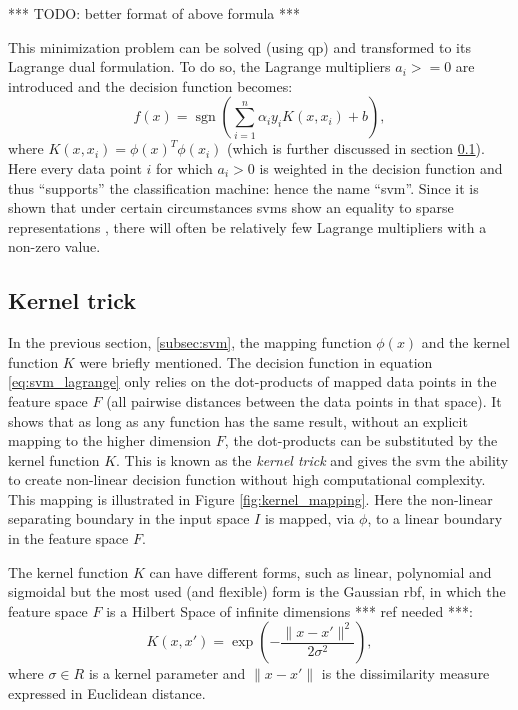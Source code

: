 *** TODO: better format of above formula ***

This minimization problem can be solved (using \gls{qp}) and transformed to its Lagrange dual formulation.
To do so, the Lagrange multipliers $a_i >= 0$ are introduced and the decision function becomes:
\begin{equation}\label{eq:svm_lagrange}
  f(x) = \operatorname{sgn}( \sum_{i=1}^n \alpha_i y_i K(x, x_i) + b),
\end{equation}
where $K(x, x_i) = \phi(x)^T\phi(x_i)$ (which is further discussed in section \ref{subsec:kernel_trick}).
Here every data point $i$ for which $a_i > 0$ is weighted in the decision function and thus ``supports'' the classification machine: hence the name ``\acrlong{svm}''.
Since it is shown that under certain circumstances \gls{svm}s show an equality to sparse representations \cite{girosi1998equivalence}, there will often be relatively few Lagrange multipliers with a non-zero value.



\subsection{Kernel trick}\label{subsec:kernel_trick}
In the previous section, \ref{subsec:svm}, the mapping function $\phi(x)$ and the kernel function $K$ were briefly mentioned.
The decision function in equation \ref{eq:svm_lagrange} only relies on the dot-products of mapped data points in the feature space $F$ (\ie all pairwise distances between the data points in that space).
It shows \cite{flach2012machine} that as long as any function has the same result, without an explicit mapping to the higher dimension $F$, the dot-products can be substituted by the kernel function $K$.
This is known as the \emph{kernel trick} and gives the \gls{svm} the ability to create non-linear decision function without high computational complexity.
This mapping is illustrated in Figure \ref{fig:kernel_mapping}.
Here the non-linear separating boundary in the input space $I$ is mapped, via $\phi$, to a linear boundary in the feature space $F$.

The kernel function $K$ can have different forms, such as linear, polynomial and sigmoidal but the most used (and flexible) form is the Gaussian \gls{rbf}, in which the feature space $F$ is a Hilbert Space of infinite dimensions *** ref needed ***:
\begin{equation}
  K(x, x') = \operatorname{exp} \left( - \frac{ \lVert x - x' \rVert ^2}{2 \sigma^2 } \right),
\end{equation}
where $\sigma \in R$ is a kernel parameter and $\lVert x - x' \rVert$ is the dissimilarity measure expressed in Euclidean distance.


